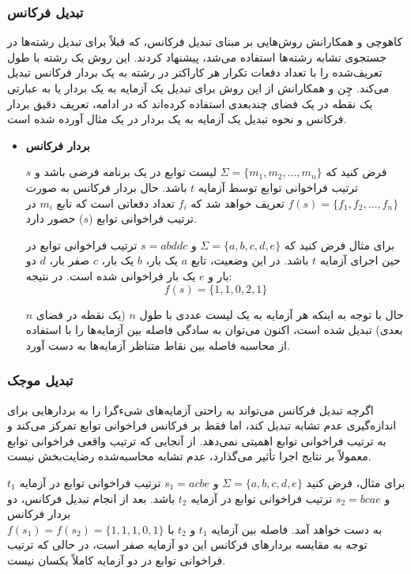 \subsubsection{تبدیل فرکانس }
کاهوچی و همکارانش \cite{kahveci2001efficient} روش‌هایی بر مبنای تبدیل فرکانس، که قبلاً برای تبدیل رشته‌ها در جستجوی تشابه رشته‌ها استفاده می‌شد، پیشنهاد کردند. این روش یک رشته با طول تعریف‌شده را با تعداد دفعات تکرار هر کاراکتر در رشته به یک بردار فرکانس تبدیل می‌کند. چِن و همکارانش از این روش برای تبدیل یک آزمایه به یک بردار یا به عبارتی یک نقطه در یک فضای چندبعدی استفاده کرده‌اند که در ادامه، تعریف دقیق بردار فرکانس و نحوه تبدیل یک آزمایه به یک بردار در یک مثال آورده شده است.

\begin{itemize}
	\item \textbf{بردار فرکانس}
	
	فرض کنید که \(\Sigma = \{m_1, m_2, \dots, m_n\}\) لیست توابع در یک برنامه فرضی باشد و \(s\) ترتیب فراخوانی توابع توسط آزمایه \(t\) باشد. حال بردار فرکانس به صورت 
	\(f(s) = \{f_1, f_2, \dots, f_n\}\)
	 تعریف خواهد شد که \(f_i\) تعداد دفعاتی است که تابع \(m_i\) در ترتیب فراخوانی توابع (\(s\)) حضور دارد.
	
	برای مثال فرض کنید که \(\Sigma = \{a, b, c, d, e\}\) و \(s = abddc\) ترتیب فراخوانی توابع در حین اجرای آزمایه \(t\) باشد. در این وضعیت، تابع \(a\) یک بار، \(b\) یک بار، \(c\) صفر بار، \(d\) دو بار و \(e\) یک بار فراخوانی شده است. در نتیجه:
	\[
	f(s) = \{1, 1, 0, 2, 1\}
	\]
	
	حال با توجه به اینکه هر آزمایه به یک لیست عددی با طول \(n\) (یک نقطه در فضای \(n\) بعدی) تبدیل شده است، اکنون می‌توان به سادگی فاصله بین آزمایه‌ها را با استفاده از محاسبه فاصله بین نقاط متناظر آزمایه‌ها به دست آورد.
	
\end{itemize}

\subsubsection{تبدیل موجک}
اگرچه تبدیل فرکانس می‌تواند به راحتی آزمایه‌های شیء‌گرا را به بردارهایی برای اندازه‌گیری عدم تشابه تبدیل کند، اما فقط بر فرکانس فراخوانی توابع تمرکز می‌کند و به ترتیب فراخوانی توابع اهمیتی نمی‌دهد. از آنجایی که ترتیب واقعی فراخوانی توابع معمولاً بر نتایج اجرا تأثیر می‌گذارد، عدم تشابه محاسبه‌شده رضایت‌بخش نیست.

برای مثال، فرض کنید \(\Sigma = \{a, b, c, d, e\}\) و \(s_1 = acbe\) ترتیب فراخوانی توابع در آزمایه \(t_1\) و \(s_2 = bcae\) ترتیب فراخوانی توابع در آزمایه \(t_2\) باشد. بعد از انجام تبدیل فرکانس، دو بردار فرکانس\\ \(f(s_1) = f(s_2) = \{1, 1, 1, 0, 1\}\) به دست خواهد آمد. فاصله بین آزمایه \(t_1\) و \(t_2\) با توجه به مقایسه بردارهای فرکانس این دو آزمایه صفر است، در حالی که ترتیب فراخوانی توابع در دو آزمایه کاملاً یکسان نیست.

